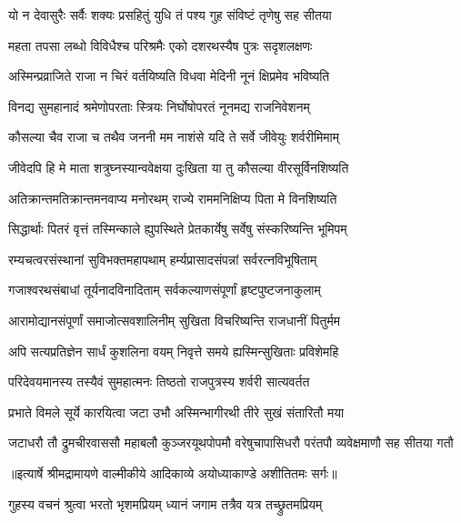 \twolineshloka
{यो न देवासुरैः सर्वैः शक्यः प्रसहितुं युधि}
{तं पश्य गुह संविष्टं तृणेषु सह सीतया} %

\twolineshloka
{महता तपसा लब्धो विविधैश्च परिश्रमैः}
{एको दशरथस्यैष पुत्रः सदृशलक्षणः} %

\twolineshloka
{अस्मिन्प्रव्राजिते राजा न चिरं वर्तयिष्यति}
{विधवा मेदिनी नूनं क्षिप्रमेव भविष्यति} %

\twolineshloka
{विनद्य सुमहानादं श्रमेणोपरताः स्त्रियः}
{निर्घोषोपरतं नूनमद्य राजनिवेशनम्} %

\twolineshloka
{कौसल्या चैव राजा च तथैव जननी मम}
{नाशंसे यदि ते सर्वे जीवेयुः शर्वरीमिमाम्} %

\twolineshloka
{जीवेदपि हि मे माता शत्रुघ्नस्यान्ववेक्षया}
{दुःखिता या तु कौसल्या वीरसूर्विनशिष्यति} %

\twolineshloka
{अतिक्रान्तमतिक्रान्तमनवाप्य मनोरथम्}
{राज्ये राममनिक्षिप्य पिता मे विनशिष्यति} %

\twolineshloka
{सिद्धार्थाः पितरं वृत्तं तस्मिन्काले ह्युपस्थिते}
{प्रेतकार्येषु सर्वेषु संस्करिष्यन्ति भूमिपम्} %

\twolineshloka
{रम्यचत्वरसंस्थानां सुविभक्तमहापथाम्}
{हर्म्यप्रासादसंपन्नां सर्वरत्नविभूषिताम्} %

\twolineshloka
{गजाश्वरथसंबाधां तूर्यनादविनादिताम्}
{सर्वकल्याणसंपूर्णां हृष्टपुष्टजनाकुलाम्} %

\twolineshloka
{आरामोद्यानसंपूर्णां समाजोत्सवशालिनीम्}
{सुखिता विचरिष्यन्ति राजधानीं पितुर्मम} %

\twolineshloka
{अपि सत्यप्रतिज्ञेन सार्धं कुशलिना वयम्}
{निवृत्ते समये ह्यस्मिन्सुखिताः प्रविशेमहि} %

\twolineshloka
{परिदेवयमानस्य तस्यैवं सुमहात्मनः}
{तिष्ठतो राजपुत्रस्य शर्वरी सात्यवर्तत} %

\twolineshloka
{प्रभाते विमले सूर्ये कारयित्वा जटा उभौ}
{अस्मिन्भागीरथी तीरे सुखं संतारितौ मया} %

\fourlineindentedshloka
{जटाधरौ तौ द्रुमचीरवाससौ}
{ महाबलौ कुञ्जरयूथपोपमौ}
{वरेषुचापासिधरौ परंतपौ}
{ व्यवेक्षमाणौ सह सीतया गतौ} %


{॥इत्यार्षे श्रीमद्रामायणे वाल्मीकीये आदिकाव्ये अयोध्याकाण्डे अशीतितमः सर्गः॥}


\twolineshloka
{गुहस्य वचनं श्रुत्वा भरतो भृशमप्रियम्}
{ध्यानं जगाम तत्रैव यत्र तच्छ्रुतमप्रियम्} %

